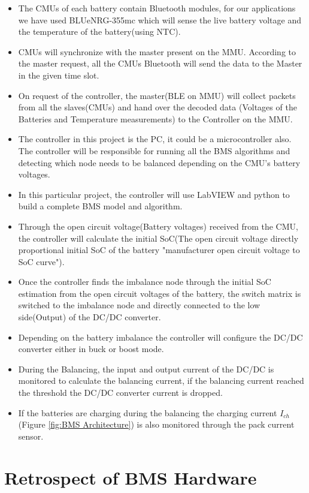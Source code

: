 \begin{itemize}
	\item The CMUs of each battery contain Bluetooth modules, for our applications we have used BLUeNRG-355mc which will sense the live battery voltage and the temperature of the battery(using NTC).
	\item CMUs will synchronize with the master present on the MMU. According to the master request, all the CMUs Bluetooth will send the data to the Master in the given time slot.
	\item On request of the controller, the master(BLE on MMU) will collect packets from all the slaves(CMUs) and hand over the decoded data (Voltages of the Batteries and Temperature measurements) to the Controller on the MMU.
	\item The controller in this project is the PC, it could be a microcontroller also. The controller will be responsible for running all the BMS algorithms and detecting which node needs to be balanced depending on the CMU's battery voltages.
	\item In this particular project, the controller will use LabVIEW and python to build a complete BMS model and algorithm.
	\item Through the open circuit voltage(Battery voltages) received from the CMU, the controller will calculate the initial SoC(The open circuit voltage directly proportional initial SoC of the battery "manufacturer open circuit voltage to SoC curve").
	\item Once the controller finds the imbalance node through the initial SoC estimation from the open circuit voltages of the battery, the switch matrix is switched to the imbalance node and directly connected to the low side(Output) of the DC/DC converter.
	\item Depending on the battery imbalance the controller will configure the DC/DC converter either in buck or boost mode.
	\item During the Balancing, the input and output current of the DC/DC is monitored to calculate the balancing current, if the balancing current reached the threshold the DC/DC converter current is dropped.
	\item If the batteries are charging during the balancing the charging current \textit{$I_{ch}$}(Figure \ref{fig:BMS Architecture}) is also monitored through the pack current sensor.
\end{itemize}
\section{Retrospect of BMS Hardware}





